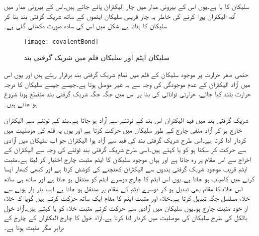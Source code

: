 سلیکان کا   یا  ہے۔یوں اس کے بیرونی مدار میں چار الیکٹران پائے جاتے ہیں۔اس کے بیرونی مدار میں آٹھ الیکٹران پورا کرنے کی خاطر یہ چار قریبی سلیکان ایٹموں کے ساتھ شریک گرفتی بند بنا کر سلیکان کا   بناتا ہے۔شکل   میں اس کی سادہ صورت دکھائی گئی ہے۔  
\begin{figure}
\centering
\texttt{[image: covalentBond]}
\caption{سلیکان ایٹم اور سلیکان قلم میں شریک گرفتی بند}
\label{شکل_سلیکان_ایٹم_اور_شریک_گرفتی_بند}
\end{figure}
حتمی صفر حرارت  پر موجود سلیکان کے قلم میں تمام شریک گرفتی بند برقرار رہتے ہیں اور یوں اس میں آزاد الیکٹران  کے عدم موجودگی کی وجہ سے یہ غیر موصل ہوتا ہے۔جیسے جیسے سلیکان کا درجہ حرارت بلند کیا جائے، حرارتی توانائی کی بنا پر اس میں جگہ جگہ شریک گرفتی بند منقطع ہونا شروع ہو جاتے ہیں۔

شریک گرفتی بند میں قید الیکٹران اس بند کے ٹوٹنے سے آزاد ہو جاتا ہے۔بند کے ٹوٹنے سے الیکٹران خارج ہو کر آزاد منفی چارج کے طور  سلیکان میں حرکت کرتا ہے اور یوں یہ قلم کی موصلیت میں کردار ادا کرتا ہے۔اس طرح شریک گرفتی بند کی قید سے آزاد ہوا الیکٹران جو اب سلیکان میں آزادی سے حرکت کر سکتا ہو کو  یا   کہتے ہیں۔اسی طرح شریک گرفتی بند ٹوٹنے کی وجہ سے الیکٹران کے اخراج سے اس مقام پر  رہ جاتا ہے اور یہاں موجود سلیکان کا ایٹم مثبت چارج اختیار کر لیتا ہے۔مثبت ایٹم قریب موجود شریک گرفتی بندوں سے الیکٹران کھنچنے کی کوشش کرتا ہے اور کبھی کبھار ایسا کرنے میں کامیاب ہو جاتا ہے۔یوں اس ایٹم کا چارج دوسرے ایٹم کو منتقل ہو جاتا ہے اور ساتھ ہی ساتھ اس خلاء کا مقام بھی تبدیل ہو کر دوسرے ایٹم کے مقام پر منتقل ہو جاتا ہے۔ایسا بار بار ہونے سے خلاء مسلسل جگہ تبدیل کرتا ہے۔خلاء اور مثبت ایٹم کا مقام ایک ساتھ حرکت کرتے ہیں گویا کہ خلاء از خود مثبت چارج ہو۔یوں سلیکان میں آزادی سے حرکت کرتے مثبت خلاء کو  یا   کہتے ہیں۔آزاد خول بالکل  کی طرح سلیکان کی موصلیت میں کردار ادا کرتا ہے۔آزاد خول کا چارج الیکٹران کے چارج کے برابر مگر مثبت ہوتا ہے۔


